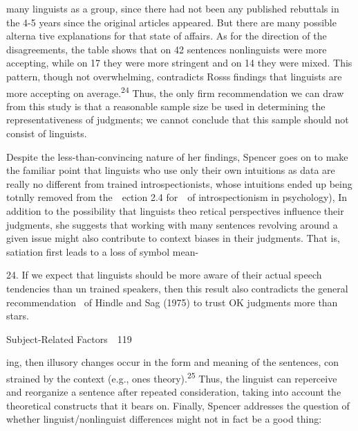 \begin{styleTextbody}
many linguists as a group,{\textquotedbl} since there had not been any published rebuttals in the 4-5 years since the original articles appeared. But there are many possible alterna\- tive explanations for that state of affairs. As for the direction of the disagreements, the table shows that on 42 sentences nonlinguists were more accepting, while on 17 they were more stringent and on 14 they were mixed. This pattern, though not overwhelming, contradicts Ross{\textquotesingle}s findings that linguists are more accepting on average.\textsuperscript{24}\textsuperscript{ }Thus, the only firm recommendation we can draw from this study is that a reasonable sample size be used in determining the representativeness of judgments; we cannot conclude that this sample should not consist of linguists.
\end{styleTextbody}


\begin{styleTextbody}
Despite the less-than-convincing nature of her findings, Spencer goes on to make the familiar point that linguists who use only their own intuitions as data are really no different from trained introspectionists, whose intuitions ended up being totnlly removed from the\ \ ection 2.4 for\ \ of introspectionism in psychology), In addition to the possibility that linguists{\textquotesingle} theo\- retical perspectives influence their judgments, she suggests that working with many sentences revolving around a given issue might also contribute to context biases in their judgments. That is, satiation first leads to a loss of symbol mean-
\end{styleTextbody}


\begin{styleStandard}
24. If we expect that linguists should be more aware of their actual speech tendencies than un\- trained speakers, then this result also contradicts the general recommendation \ of Hindle and Sag (1975) to trust {\textquotedbl}OK{\textquotedbl} judgments more than stars.
\end{styleStandard}


\clearpage\setcounter{page}{1}\begin{styleStandard}
Subject-Related Factors\ \ 119
\end{styleStandard}


\begin{styleTextbody}
ing, then illusory changes occur in the form and meaning of the sentences, con\- strained by the context (e.g., one{\textquotesingle}s theory).\textsuperscript{25}\textsuperscript{ }Thus, the linguist can reperceive and reorganize a sentence after repeated consideration, taking into account the theoretical constructs that it bears on. Finally, Spencer addresses the question of whether linguist/nonlinguist differences might not in fact be a good thing:
\end{styleTextbody}


